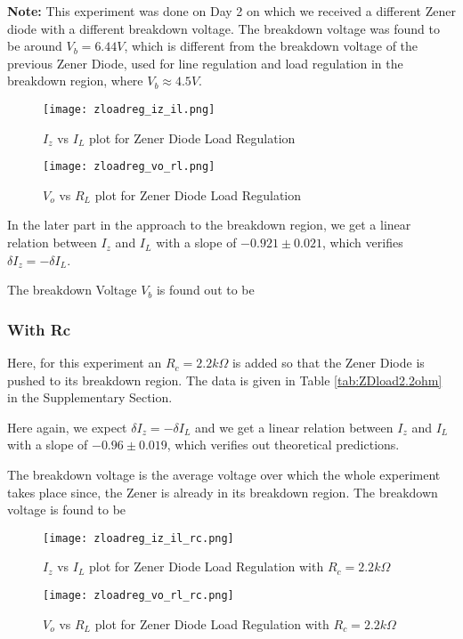 \documentclass{scrartcl}
\newcommand{\1}{\mathbbm{1}}
\begin{document}
\textbf{Note:} This experiment was done on Day 2 on which we received a different Zener diode with a different
breakdown voltage. The breakdown voltage was found to be around $V_b = 6.44V$, which is different from the breakdown voltage of 
the previous Zener Diode, used for line regulation and load regulation in the breakdown region, where $V_b \approx 4.5 V$.
\begin{figure}[H]
	\centering
	\texttt{[image: zloadreg\_iz\_il.png]}
	\caption{$I_z$ vs $I_L$ plot for Zener Diode Load Regulation}
\end{figure}
\begin{figure}[H]
	\centering
	\texttt{[image: zloadreg\_vo\_rl.png]}
	\caption{$V_o$ vs $R_L$ plot for Zener Diode Load Regulation}
\end{figure}
In the later part in the approach to the breakdown region, we get a linear relation between $I_z$ and $I_L$ with a slope of $\pmb{-0.921 \pm 0.021}$, which 
verifies $\delta I_z = - \delta I_L$. 


The breakdown Voltage $V_b$ is found out to be \\ 

\begin{center}\end{center}
\subsubsection{With Rc}
Here, for this experiment an $R_c = 2.2 k\Omega$ is added so that the Zener Diode is pushed to its breakdown region. 
The data is given in Table \ref{tab:ZDload2.2ohm} in the Supplementary Section. 


Here again, we expect $\delta I_z = -\delta I_L$ and we get a linear relation between $I_z$ and $I_L$ with a slope of $\pmb{-0.96 \pm 0.019}$, which
verifies out theoretical predictions. 

The breakdown voltage is the average voltage over which the whole experiment takes place since,
the Zener is already in its breakdown region. The breakdown voltage is found to be \\
\begin{center}\end{center}
\begin{figure}[H]
	\centering
	\texttt{[image: zloadreg\_iz\_il\_rc.png]}
	\caption{$I_z$ vs $I_L$ plot for Zener Diode Load Regulation with $R_c = 2.2 k\Omega$}
\end{figure}
\begin{figure}[H]
	\centering
	\texttt{[image: zloadreg\_vo\_rl\_rc.png]}
	\caption{$V_o$ vs $R_L$ plot for Zener Diode Load Regulation with $R_c = 2.2 k\Omega$}
\end{figure}
\end{document}
